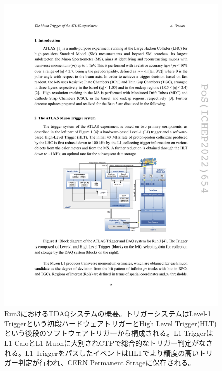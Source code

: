     \begin{figure} 
    \centering
    \includegraphics[width=16cm]{fig/Intro/Run3_TDAQ.pdf}
    \caption[Run3におけるTDAQシステムの概要]{Run3におけるTDAQシステムの概要\cite{Run3_TDAQ}。トリガーシステムはLevel-1 Triggerという初段ハードウェアトリガーとHigh Level Trigger(HLT)という後段のソフトウェアトリガーから構成される。L1 TriggerはL1 CaloとL1 Muonに大別されCTPで総合的なトリガー判定がなされる。L1 TriggerをパスしたイベントはHLTでより精度の高いトリガー判定が行われ、CERN Permanent Strageに保存される。 }
    \label{Run3_TDAQ}
    \end{figure}

